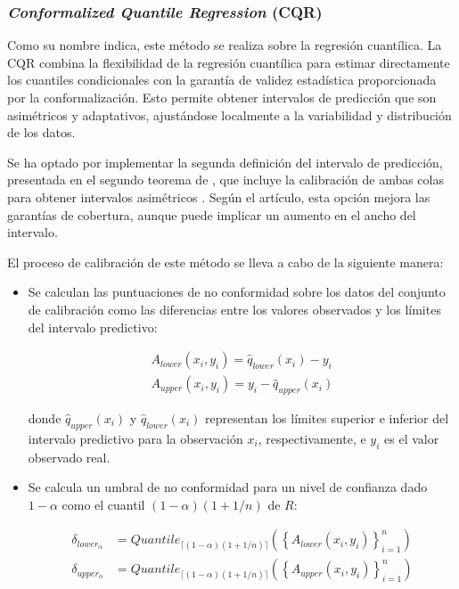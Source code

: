 
\subsubsection{\textit{Conformalized Quantile Regression} (CQR)}

Como su nombre indica, este método se realiza sobre la regresión cuantílica. La CQR \cite{romano2019} combina la flexibilidad de la regresión cuantílica para estimar directamente los cuantiles condicionales con la garantía de validez estadística proporcionada por la conformalización. Esto permite obtener intervalos de predicción que son asimétricos y adaptativos, ajustándose localmente a la variabilidad y distribución de los datos.

Se ha optado por implementar la segunda definición del intervalo de predicción, presentada en el segundo teorema de \cite{romano2019}, que incluye la calibración de ambas colas para obtener intervalos asimétricos \cite{linusson2014}. Según el artículo, esta opción mejora las garantías de cobertura, aunque puede implicar un aumento en el ancho del intervalo.

El proceso de calibración de este método se lleva a cabo de la siguiente manera: 

\begin{itemize}
    \item Se calculan las puntuaciones de no conformidad sobre los datos del conjunto de calibración como las diferencias entre los valores observados y los límites del intervalo predictivo:
    
    \begin{equation*}
    \begin{split}
        A_{lower}(x_i,y_i) = \hat{q}_{lower}(x_i) - y_i \\
        A_{upper}(x_i,y_i) = y_i - \hat{q}_{upper}(x_i)  
    \end{split}
    \end{equation*}

    donde $\hat{q}_{upper}(x_i)$ y $\hat{q}_{lower}(x_i)$ representan los límites superior e inferior del intervalo predictivo para la observación $x_i$, respectivamente, e $y_i$ es el valor observado real.

    \item Se calcula un umbral de no conformidad para un nivel de confianza dado $1-\alpha$ como el cuantil $(1-\alpha)(1+1/n)$ de $R$:

    \begin{equation*}
    \begin{split}
        \delta_{lower_\alpha} &= Quantile_{ \lceil  (1-\alpha) (1 + 1/n)  \rceil } ( \left\{ A_{lower}(x_i,y_i) \right\}_{i=1}^n  ) \\
        \delta_{upper_\alpha} &= Quantile_{ \lceil  (1-\alpha) (1 + 1/n)  \rceil } ( \left\{ A_{upper}(x_i,y_i) \right\}_{i=1}^n  )
    \end{split}
    \end{equation*}

\end{itemize}

